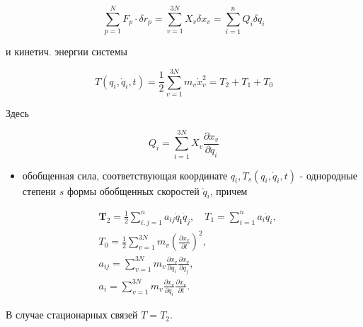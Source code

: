 \documentclass[10pt]{article}
\begin{document}
\[

\sum_{p=1}^{N} F_{p} \cdot \delta r_{p}=\sum_{v=1}^{3 N} X_{v} \delta x_{v}=\sum_{i=1}^{n} Q_{i} \delta q_{i}

\]



и кинетич. энергии системы



\[

T\left(q_{i}, \dot{q}_{i}, t\right)=\frac{1}{2} \sum_{v=1}^{3 N} m_{v} \dot{x}_{v}^{2}=T_{2}+T_{1}+T_{0}

\]



Здесь



\[

Q_{i}=\sum_{i=1}^{3 N} X_{v} \frac{\partial x_{v}}{\partial q_{i}}

\]



\begin{itemize}

  \item обобщенная сила, соответствующая координате $q_{i}, T_{s}\left(q_{i}, \dot{q}_{i}, t\right)$ - однородные степени $s$ формы обобщенных скоростей $\dot{q}_{i}$, причем

\end{itemize}



\[

\begin{aligned}

& \boldsymbol{T}_{2}=\frac{1}{2} \sum_{i, j=1}^{n} a_{i j} \dot{q}_{\boldsymbol{i}} \dot{q}_{j}, \quad T_{1}=\sum_{i=1}^{n} a_{i} \dot{q}_{i}, \\

& T_{0}=\frac{1}{2} \sum_{v=1}^{3 N} m_{v}\left(\frac{\partial x_{v}}{\partial t}\right)^{2}, \\

& a_{i j}=\sum_{v=1}^{3 N} m_{v} \frac{\partial x_{v}}{\partial q_{i}} \frac{\partial x_{v}}{\partial q_{j}}, \\

& a_{i}=\sum_{v=1}^{3 N} m_{v} \frac{\partial x_{v}}{\partial q_{i}} \frac{\partial x_{v}}{\partial t} .

\end{aligned}

\]



В случае стационарных связей $T=T_{2}$.
\end{document}
